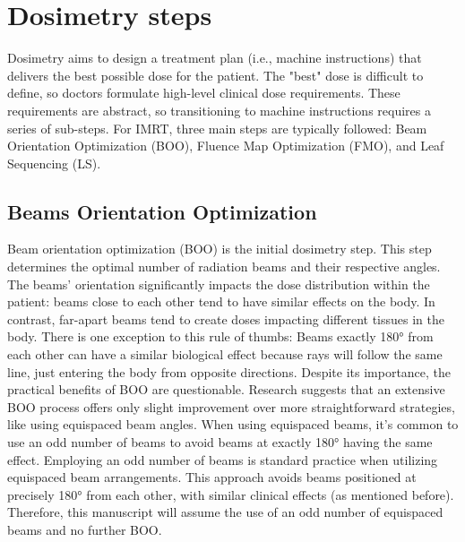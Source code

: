 


\section{Dosimetry steps}
Dosimetry aims to design a treatment plan (i.e., machine instructions) that delivers the best possible dose for the patient.
The "best" dose is difficult to define, so doctors formulate high-level clinical dose requirements.
These requirements are abstract, so transitioning to machine instructions requires a series of sub-steps.
For IMRT, three main steps are typically followed: Beam Orientation Optimization (BOO), Fluence Map Optimization (FMO), and Leaf Sequencing (LS).
\subsection[BOO]{Beams Orientation Optimization}
Beam orientation optimization (BOO) is the initial dosimetry step.
This step determines the optimal number of radiation beams and their respective angles.
The beams' orientation significantly impacts the dose distribution within the patient: beams close to each other tend to have similar effects on the body.
In contrast, far-apart beams tend to create doses impacting different tissues in the body.
There is one exception to this rule of thumbs: Beams exactly 180° from each other can have a similar biological effect because rays will follow the same line, just entering the body from opposite directions.
Despite its importance, the practical benefits of BOO are questionable.
Research \cite{Rocha2019} suggests that an extensive BOO process offers only slight improvement over more straightforward strategies, like using equispaced beam angles.
When using equispaced beams, it's common to use an odd number of beams to avoid beams at exactly 180° having the same effect.
Employing an odd number of beams is standard practice when utilizing equispaced beam arrangements.
This approach avoids beams positioned at precisely 180° from each other, with similar clinical effects (as mentioned before).
Therefore, this manuscript will assume the use of an odd number of equispaced beams and no further BOO.

